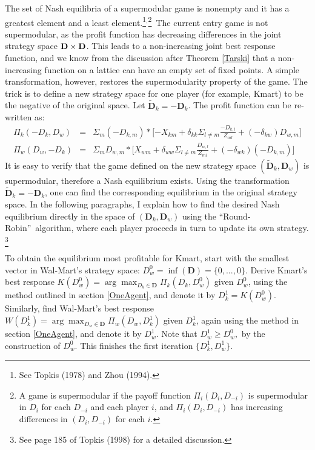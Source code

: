 \documentclass[notitlepage,onecolumn,11pt]{article}
\begin{document}
The set of Nash equilibria of a supermodular game is nonempty and it has a
greatest element and a least element.\footnote{%
See Topkis (1978) and Zhou (1994).}$^{,}$\footnote{%
A game is supermodular if the payoff function $\Pi _{i}(D_{i},D_{-i})$ is
supermodular in $D_{i}$ for each $D_{-i}$ and each player $i$, and $\Pi
_{i}(D_{i},D_{-i})$ has increasing differences in $(D_{i},D_{-i})$ for each $%
i.$}\ The current entry game is not supermodular, as the profit function has
decreasing differences in the joint strategy space $\mathbf{D}\times \mathbf{%
D}$. This leads to a non-increasing joint best response function, and we
know from the discussion after Theorem \ref{Tarski} that a non-increasing
function on a lattice can have an empty set of fixed points. A simple
transformation, however, restores the supermodularity property of the game.
The trick is to define a new strategy space for one player (for example,
Kmart) to be the negative of the original space. Let $\widetilde{\mathbf{D}}%
_{k}=-\mathbf{D}_{k}$. The profit function can be re-written as: 
\begin{eqnarray*}
\Pi _{k}(-D_{k},D_{w}) &=&\Sigma _{m}(-D_{k,m})\ast \lbrack -X_{km}+\delta
_{kk}\Sigma _{l\neq m}\frac{-D_{k,l}}{Z_{ml}}+(-\delta _{kw})D_{w,m}] \\
\Pi _{w}(D_{w},-D_{k}) &=&\Sigma _{m}D_{w,m}\ast \lbrack X_{wm}+\delta
_{ww}\Sigma _{l\neq m}\frac{D_{w,l}}{Z_{ml}}+(-\delta _{wk})(-D_{k,m})]
\end{eqnarray*}%
It is easy to verify that the game defined on the new strategy space $(%
\widetilde{\mathbf{D}}_{k},\mathbf{D}_{w})$ is supermodular, therefore a
Nash equilibrium exists. Using the transformation $\widetilde{\mathbf{D}}%
_{k}=-\mathbf{D}_{k}$, one can find the corresponding equilibrium in the
original strategy space. In the following paragraphs, I explain how to find
the desired Nash equilibrium directly in the space of $(\mathbf{D}_{k},%
\mathbf{D}_{w})$ using the \textquotedblleft Round-Robin\textquotedblright\
algorithm, where each player proceeds in turn to update its own strategy.%
\footnote{%
See page 185 of Topkis (1998) for a detailed discussion.}

To obtain the equilibrium most profitable for Kmart, start with the smallest
vector in Wal-Mart's strategy space: $D_{w}^{0}=\inf (\mathbf{D}%
)=\{0,...,0\}.$ Derive Kmart's best response $K(D_{w}^{0})=\arg
\max_{D_{k}\in \mathbf{D}}\Pi _{k}(D_{k},D_{w}^{0})$ given $D_{w}^{0}$,
using the method outlined in section \ref{OneAgent}, and denote it by $%
D_{k}^{1}=K(D_{w}^{0}).$ Similarly, find Wal-Mart's best response $%
W(D_{k}^{1})=\arg \max_{D_{w}\in \mathbf{D}}\Pi _{w}(D_{w},D_{k}^{1})$ given 
$D_{k}^{1}$, again using the method in section \ref{OneAgent}, and denote it
by $D_{w}^{1}.$ Note that $D_{w}^{1}\geq D_{w}^{0},$ by the construction of $%
D_{w}^{0}\mathbf{.}$ This finishes the first iteration $%
\{D_{k}^{1},D_{w}^{1}\}.$
\end{document}
